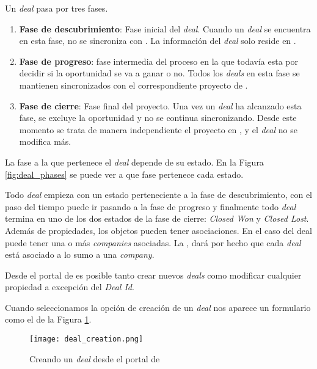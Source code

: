 		
		
		
		
		Un \textit{deal} pasa por tres fases.
		
		\begin{enumerate}
			\item \textbf{Fase de descubrimiento}: Fase inicial del \textit{deal}. Cuando un \textit{deal} se encuentra en esta fase, no se sincroniza con \wday. La información del \textit{deal} solo reside en \hs.
			\item \textbf{Fase de progreso}: fase intermedia del proceso en la que todavía esta por decidir si la oportunidad se va a ganar o no. Todos los \textit{deals} en esta fase se mantienen sincronizados con el correspondiente proyecto de \wday.
			\item \textbf{Fase de cierre}: Fase final del proyecto. Una vez un \textit{deal} ha alcanzado esta fase, se excluye la oportunidad y no se continua sincronizando. Desde este momento se trata de manera independiente el proyecto en \wday{}, y el \textit{deal} no se modifica más. 
		\end{enumerate}
	
		La fase a la que pertenece el \textit{deal} depende de su estado. En la Figura \ref{fig:deal_phases} se puede ver a que fase pertenece cada estado.
		
		
		Todo \textit{deal} empieza con un estado perteneciente a la fase de descubrimiento, con el paso del tiempo puede ir pasando a la fase de progreso y finalmente todo \textit{deal} termina en uno de los dos estados de la fase de cierre: \textit{Closed Won} y \textit{Closed Lost}.\\
			
			
		Además de propiedades, los objetos pueden tener asociaciones. En el caso del deal puede tener una o más \textit{companies} asociadas. La \iface{}, dará por hecho que cada \textit{deal} está asociado a lo sumo a una \textit{company}.
			
		Desde el portal de \hs{} es posible tanto crear nuevos \textit{deals} como modificar cualquier propiedad a excepción del \textit{Deal Id}.
		
		Cuando seleccionamos la opción de creación de un \textit{deal} nos aparece un formulario como el de la Figura \ref{fig:create_deal}.
		
		\begin{figure}
			\centering
			\texttt{[image: deal\_creation.png]}
			\caption{Creando un \textit{deal} desde el portal de \hs{}}
			\label{fig:create_deal}
		\end{figure}

